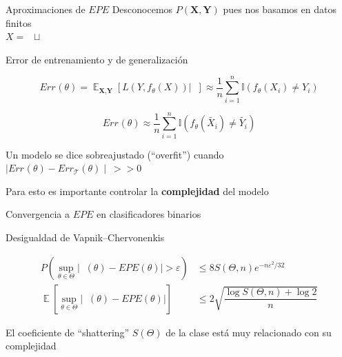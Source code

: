 \documentclass[xcolor=x11names]{beamer}
\DeclareMathOperator{\Expect}{\mathbb{E}}
\DeclareMathOperator{\trainsetn}{\mathcal{T}^{(n)}}
\DeclareMathOperator{\trainset}{\mathcal{T}}
\DeclareMathOperator{\testsetn}{\mathcal{T_s}^{(n)}}
\DeclareMathOperator{\testset}{\mathcal{T_s}}
\begin{document}
\begin{frame}{Aproximaciones de $EPE$}
	\centering
	Desconocemos $P(\textbf{X},\textbf{Y})$ pues nos basamos en datos finitos\\

	$X = \trainsetn \sqcup \testsetn$

    \begin{block}{Error de entrenamiento y de generalización}

        $$  Err_{\trainsetn}(\theta) =
        \Expect_{ \textbf{X}, \textbf{Y} } \left[ L(Y,f_{\theta}(X))  |  \trainsetn \right] \approx
        \dfrac{1}{n} \sum_{i=1}^{n} \mathbb{I} \left(f_\theta (X_{i})\neq Y_{i} \right)  $$

        $$Err_{\testsetn}(\theta) \approx
        \dfrac{1}{n} \sum_{i=1}^{n} \mathbb{I} \left(f_\theta (\tilde{X_{i}})\neq \tilde{Y_{i}} \right)  $$

	\end{block}

	Un modelo se dice sobreajustado (``overfit'') cuando $\mid Err_{\testset}(\theta) - Err_{\trainset}(\theta)  \mid \ >> 0$

	Para esto es importante controlar la \textbf{complejidad} del modelo

\end{frame}

\begin{frame}{Convergencia a $EPE$ en clasificadores binarios}

	\begin{block}{Desigualdad de Vapnik–Chervonenkis}

		\begin{equation}
			\begin{split}
				P\left(\sup_{\theta\in \Theta}\left|\trainsetn(\theta)-EPE (\theta)\right|>\varepsilon \right) & \leq
				8S (\Theta,n) e^{{-n \varepsilon^{2}/32}}\\
				\Expect\left[\sup_{\theta \in \Theta}\left| \trainsetn(\theta)-EPE (\theta)\right|\right] &
				\leq 2\sqrt{\dfrac{\log S(\Theta,n)+\log2}{n}}
			\end{split}
		\end{equation}

	\end{block}

El coeficiente de ``shattering'' $S(\Theta)$ de la clase está muy relacionado con su complejidad
\end{frame}
\end{document}
